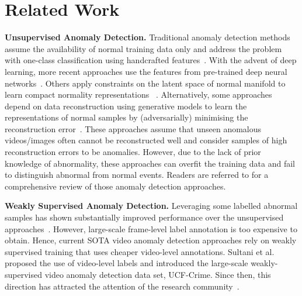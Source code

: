 \documentclass[10pt,twocolumn,letterpaper]{article}
\begin{document}
  




\section{Related Work}

\textbf{Unsupervised Anomaly Detection.} Traditional anomaly detection methods assume the availability of normal training data only and address the problem with one-class classification using handcrafted features~\cite{medioni2001event,basharat2008learning,wang2014learning,zhang2009learning}. 
With the advent of deep learning, more recent approaches use the features from pre-trained deep neural networks~\cite{zhao2020exploring,smeureanu2017deep,pang2020self,tudor2017unmasking,fang2020anomaly}. Others apply constraints on the latent space of normal manifold to learn compact normality representations
~\cite{Markovitz_2020_CVPR,Bergmann_2020_CVPR,Park_2020_CVPR,Bergmann_2019_CVPR,Morais_2019_CVPR,Abati_2019_CVPR,Perera_2019_CVPR,bergman2020classification,zhou2020encoding,Sabokrou_2018_CVPR,ruff2018deep,golan2018deep,wang2019gods,del2016discriminative,Cheng_2015_CVPR,tian2021constrained,liu2020photoshopping,chen2021unsupervised,sun2020discriminative}. 
Alternatively, some approaches depend on data reconstruction using generative models to learn the representations of normal samples by (adversarially) minimising the reconstruction error~\cite{liu2018future,ren2015unsupervised,xu2015learning,ionescu2019object,gong2019memorizing,sabokrou2017deep,Sabokrou_2018_CVPR,morais2019learning,ionescu2019object,Park_2020_CVPR,Burlina_2019_CVPR,venkataramanan2019attention,zong2018deep,Nguyen_2019_ICCV,nguyen2019anomaly}. These approaches assume that unseen anomalous videos/images often cannot be reconstructed well and consider samples of high reconstruction errors to be anomalies.
However, due to the lack of prior knowledge of abnormality, these approaches can overfit the training data and fail to distinguish abnormal from normal events. Readers are referred to \cite{pang2021deep} for a comprehensive review of those anomaly detection approaches. 



\textbf{Weakly Supervised Anomaly Detection.} Leveraging some labelled abnormal samples has shown substantially improved performance over the unsupervised approaches~\cite{tian2020few,sultani2018real,Wu2020not,liu2019margin,ruff2019deep,pang2019deep,pang2018learning,zaheer2020claws,zaheer2021cleaning,zaheer2020self}.
However, large-scale frame-level label annotation is too expensive to obtain. Hence, current SOTA video anomaly detection approaches rely on weakly supervised training that uses cheaper video-level annotations. Sultani et al.~\cite{sultani2018real} proposed the use of video-level labels and introduced the large-scale weakly-supervised video anomaly detection data set, UCF-Crime. 
Since then, this direction has attracted the attention of the research community~\cite{8803657,9102722,Wu2020not}. 
\end{document}
